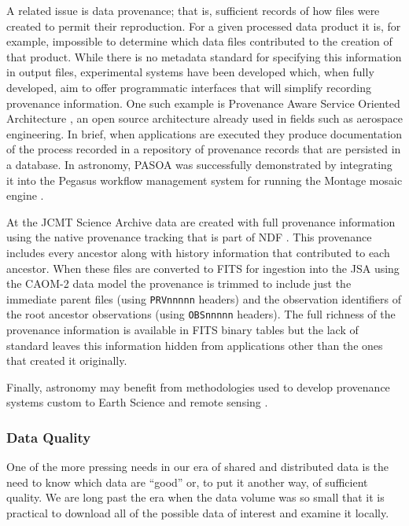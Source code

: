 \documentclass[final,authoryear,5p,times,twocolumn]{elsarticle}
\begin{document}
{{A related issue is data provenance; that is, sufficient records of how files
were created to permit their reproduction. For a given processed data product
it is, for example, impossible to determine which data files
contributed to the creation of that product. While there is no metadata standard
for specifying this
information in output files, experimental systems have been developed which, when fully developed,
aim to offer programmatic interfaces that will
simplify recording provenance information. One such example is
Provenance Aware Service Oriented Architecture
\citep[PASOA;][]{2008IPAWMoreau,2011743Moreau}, an open source architecture
already used in fields such as aerospace engineering. In brief, when
applications are executed they produce documentation of the process recorded
in a repository of provenance records that are persisted in a database. In
astronomy, PASOA was successfully demonstrated by integrating it into the
Pegasus workflow management system for running the Montage mosaic engine
\citep{2009SCGroth}.


At the JCMT Science Archive \citep[JSA;][]{2008ASPC..394..135G} data are
created with full provenance information using the native provenance
tracking that is part of NDF \citep{2009ASPC..411..418J}. This
provenance includes every ancestor along with history information that
contributed to each ancestor. When these files are converted to FITS
for ingestion into the JSA using the CAOM-2 data model
\citep{2013ASPC..475..159R} the provenance is trimmed to include
just the immediate parent files (using \texttt{PRVnnnnn} headers)
and the observation identifiers of the root ancestor observations
(using \texttt{OBSnnnnn} headers). The full richness of the provenance
information is available in FITS binary tables but the lack of standard
leaves this information hidden from applications other than the ones
that created it originally.

Finally, astronomy may benefit from methodologies used to develop provenance
systems custom to Earth Science and remote sensing
\citep{2008IPAWTilmes,2008IPAWMcCann}.


\subsubsection{Data Quality}


One of the more pressing needs in our era of shared and distributed
data is the need to know which data are ``good'' or, to put it another
way, of sufficient quality. We are long past the era when the data
volume was so small that it is practical to download all of the possible
data of interest and examine it locally.


}}
\end{document}
